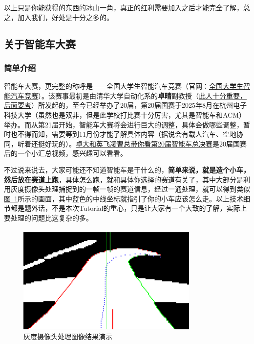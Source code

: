 \documentclass[a4paper,12pt]{article}
\begin{document}
以上只是你能获得的东西的冰山一角，真正的红利需要加入之后才能完全了解，总之，加入我们，好处是十分之多的。

\subsection{关于智能车大赛}

\subsubsection{简单介绍}
\label{sec:smart-car-intro}

智能车大赛，更完整的称呼是——全国大学生智能汽车竞赛（官网：\href{http://www.smartcarrace.com/}{全国大学生智能汽车竞赛}）。该赛事最初是由清华大学自动化系的\textbf{卓晴}副教授（\underline{此人十分重要，后面要考}）所发起的，至今已经举办了20届，第20届国赛于2025年8月在杭州电子科技大学（虽然也是双非，但是此学校打比赛十分厉害，尤其是智能车和ACM）举办。而从第21届开始，智能车大赛将会进行巨大的调整，具体会做哪些调整，暂时也不得而知，需要等到11月份才能了解具体内容（据说会有载人汽车、空地协同，听着还挺好玩的）。\href{https://www.bilibili.com/video/BV16tH2zKEdW/}{卓大和英飞凌曹总带你看第20届智能车总决赛}是20届国赛后的一个小汇总视频，感兴趣可以看看。

不过说来说去，大家可能还不知道智能车是干什么的，\textbf{简单来说，就是造个小车，然后放在赛道上跑}，具体怎么跑，就和具体你选择的赛道有关了，其中大部分是利用灰度摄像头处理捕捉到的一帧一帧的赛道信息，经过一通处理，就可以得到类似\hyperref[fig:grayscale-camera]{图~\ref*{fig:grayscale-camera}}所示的画面，其中蓝色的中线坐标就指引了你的小车应该怎么走。以上技术细节都是题外话，不是本次Tutorial的重心，只是让大家有一个大致的了解，实际上要处理的问题比这复杂的多。

\begin{figure}[h]
\centering
\includegraphics[width=0.8\textwidth]{images/aff1d4cc2e154bd084c5ffad01bf45fe.png}
\caption{灰度摄像头处理图像结果演示}
\label{fig:grayscale-camera}
\end{figure}
\end{document}
